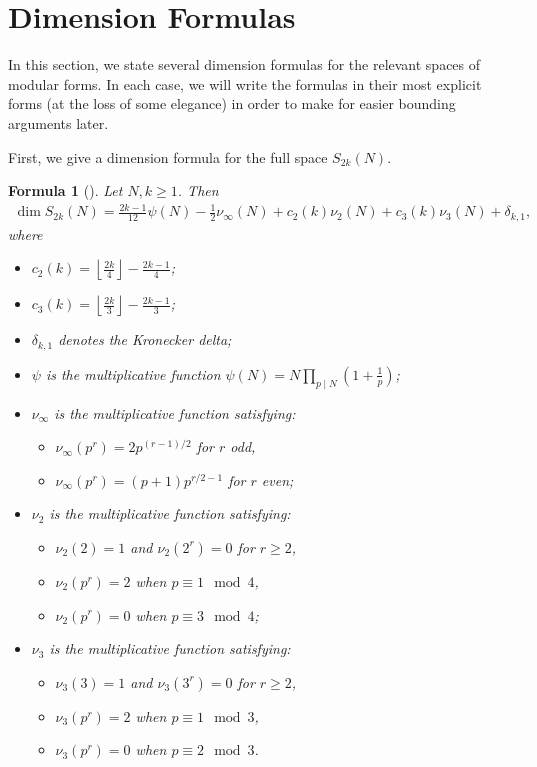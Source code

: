 \documentclass[12pt,letterpaper,reqno]{amsart}
\newtheorem{formula}[theorem]{Formula}
\theoremstyle{definition}
\numberwithin{equation}{section}
\numberwithin{figure}{section}
\numberwithin{table}{section}
\newcommand{\lrp}[1]{\left(#1\right)}
\newcommand{\lrfloor}[1]{\left\lfloor #1 \right\rfloor}
\begin{document}
\section{Dimension Formulas}
In this section, we state several dimension formulas for the relevant spaces of modular forms. In each case, we will write the formulas in their most explicit forms (at the loss of some elegance) in order to make for easier bounding arguments later. 

First, we give a dimension formula for the full space $S_{2k}(N)$. 
\begin{formula}[{\cite[Proposition 12]{martin}}] \label{form:fullspace}
    Let $N,k \ge 1$. Then
    \begin{align}
        \dim S_{2k}(N) = \frac{2k-1}{12} \psi(N) - \frac12 \nu_\infty(N) + c_2(k) \nu_2(N) + c_3(k) \nu_3(N) + \delta_{k,1},
    \end{align}
    where
    \begin{itemize}
        \item $c_2(k) = \lrfloor{\frac{2k}{4}} - \frac{2k-1}{4}$;
        \item $c_3(k) = \lrfloor{\frac{2k}{3}} - \frac{2k-1}{3}$;
        \item $\delta_{k,1}$ denotes the Kronecker delta;
        \item $\psi$ is the multiplicative function $\psi(N) = N \prod_{p \mid N} \lrp{1+ \frac1p}$;
        \item $\nu_\infty$ is the multiplicative function satisfying:
        \begin{itemize}
            \item $\nu_\infty(p^r) = 2 p^{(r-1)/2}$ for $r$ odd,
            \item $\nu_\infty(p^r) = (p+1)p^{r/2-1}$ for $r$ even;
        \end{itemize}
        \item $\nu_2$ is the multiplicative function satisfying:
        \begin{itemize}
            \item $\nu_2(2) = 1$ and $\nu_2(2^r) = 0$ for $r \ge 2$,
            \item $\nu_2(p^r) = 2$ when $p \equiv 1 \mod 4$,
            \item $\nu_2(p^r) = 0$ when $p \equiv 3 \mod 4$;
        \end{itemize}
        \item $\nu_3$ is the multiplicative function satisfying:
        \begin{itemize}
            \item $\nu_3(3) = 1$ and $\nu_3(3^r) = 0$ for $r \ge 2$,
            \item $\nu_3(p^r) = 2$ when $p \equiv 1 \mod 3$,
            \item $\nu_3(p^r) = 0$ when $p \equiv 2 \mod 3$.
        \end{itemize}
    \end{itemize}
\end{formula}
\end{document}
